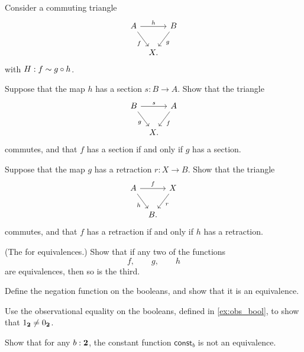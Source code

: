 \begin{exercises}
  Consider a commuting triangle
  \begin{equation*}
    \begin{tikzcd}[column sep=tiny]
      A \arrow[rr,"h"] \arrow[dr,swap,"f"] & & B \arrow[dl,"g"] \\
      & X.
    \end{tikzcd}
  \end{equation*}
  with $H:f\sim g\circ h$.
  \begin{subexenum}
  \item Suppose that the map $h$ has a section $s:B \to A$. Show that the triangle
    \begin{equation*}
      \begin{tikzcd}[column sep=tiny]
        B \arrow[rr,"s"] \arrow[dr,swap,"g"] & & A \arrow[dl,"f"] \\
        & X.
      \end{tikzcd}
    \end{equation*}
    commutes, and that $f$ has a section if and only if $g$ has a section.
  \item Suppose that the map $g$ has a retraction $r:X\to B$. Show that the triangle
    \begin{equation*}
      \begin{tikzcd}[column sep=tiny]
        A \arrow[rr,"f"] \arrow[dr,swap,"h"] & & X \arrow[dl,"r"] \\
        & B.
      \end{tikzcd}
    \end{equation*}
    commutes, and that $f$ has a retraction if and only if $h$ has a retraction.
  \item (The  for equivalences.) Show that if any two of the functions
    \begin{equation*}
      f,\qquad g,\qquad h
    \end{equation*}
    are equivalences, then so is the third.
  \end{subexenum}
\item \label{ex:neg_equiv} 
  \begin{subexenum}
  \item Define the negation function on the booleans, and show that it is an equivalence.
  \item Use the observational equality on the booleans, defined in \cref{ex:obs_bool}, to show that ${1_{\mathbf{2}}}\neq{0_{\ensuremath{\mathbf{2}}}}$.
  \item Show that for any $b:\mathbf{2}$, the constant function $\mathsf{const}_b$ is not an equivalence.

\end{subexenum}
\end{exercises}
